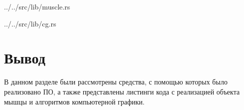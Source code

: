 \begin{lstinputlisting}[
        caption={Реализация объекта мышцы.},
        label={lst:muscle},
        style={rust},
        linerange={1-172,311-311}
    ]{../../src/lib/muscle.rs}
\end{lstinputlisting}

\begin{lstinputlisting}[
        caption={Реализация алгоритмов компьютерной графики.},
        label={lst:cg},
        style={rust},
        linerange={1-122}
    ]{../../src/lib/cg.rs}
\end{lstinputlisting}


\section*{Вывод}

В данном разделе были рассмотрены средства, с помощью которых было реализовано ПО, а также представлены листинги кода с реализацией объекта мышцы и алгоритмов компьютерной графики.
